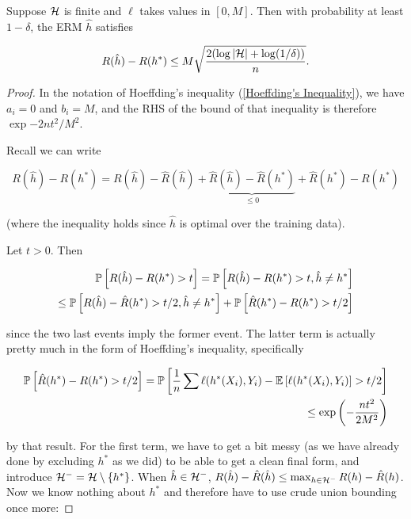 \documentclass[11pt]{scrartcl}
\begin{document}
\begin{theorem}
    Suppose $\H$ is finite and $\ell$ takes values in $[0,M]$. Then with probability at least $1-\delta$, the ERM $\hat{h}$ satisfies
    
    \begin{equation}
        R(\hat{h}) - R(h^*) \le M \sqrt{\frac{2(\log |\H| + \log(1 / \delta))}{n}}.
    \end{equation}
\begin{proof}
In the notation of Hoeffding's inequality (\ref{Hoeffding's Inequality}), we have $a_i = 0$ and $b_i = M$, and the RHS of the bound of that inequality is therefore $\exp{-2nt^2 / M^2}$.

Recall we can write 

\begin{equation}
    R(\hat{h}) - R(h^*) = R(\hat{h}) - \hat{R}(\hat{h}) + \underbrace{\hat{R}(\hat{h}) - \hat{R}(h^*)}_{\le 0} + \hat{R}(h^*) - R(h^*)
\end{equation}

(where the inequality holds since $\hat{h}$ is optimal over the training data).

Let $t>0$. Then 

\begin{align}
    \P{R(\hat{h}) - R(h^*) > t} = \P{R(\hat{h}) - R(h^*) > t, \hat{h} \neq h^*} \\
    \le \P{R(\hat{h}) - \hat{R}(h^*) > t/2, \hat{h} \neq h^*} + \P{\hat{R}(h^*) - R(h^*) > t/2}
\end{align}

since the two last events imply the former event. The latter term is actually pretty much in the form of Hoeffding's inequality, specifically

\begin{align}
    \P{\hat{R}(h^*) - R(h^*) > t/2} = \P{ \frac1n \sum \ell(h^*(X_i), Y_i) - \E{\ell(h^*(X_i), Y_i)} > t/2} \\
    \le \exp{-\frac{nt^2}{2M^2}}
\end{align}

by that result. For the first term, we have to get a bit messy (as we have already done by excluding $h^*$ as we did) to be able to get a clean final form, and introduce $\H^- = \H \setminus \{ h^* \}$. When $\hat{h} \in \H^-$,  $R(\hat{h}) - \hat{R}(\hat{h}) \le \max_{h \in \H^-} R(h) - \hat{R}(h)$. Now we know nothing about $h^*$ and therefore have to use crude union bounding once more:


\end{proof}
\end{theorem}
\end{document}
